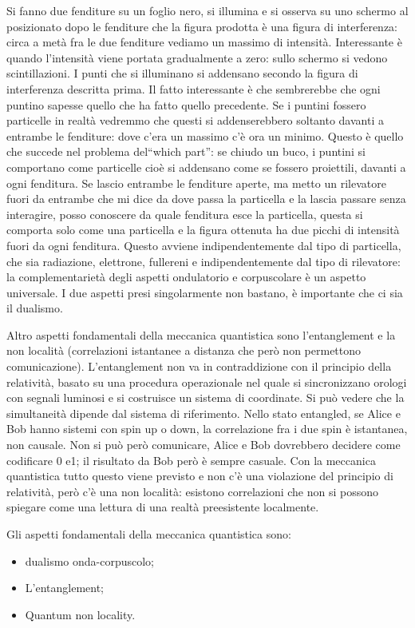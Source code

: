 Si fanno due fenditure su un foglio nero, si illumina e si osserva
su uno schermo al posizionato dopo le fenditure che la figura prodotta
è una figura di interferenza: circa a metà fra le due fenditure vediamo
un massimo di intensità. Interessante è quando l'intensità viene portata
gradualmente a zero: sullo schermo si vedono scintillazioni. I punti
che si illuminano si addensano secondo la figura di interferenza descritta
prima. Il fatto interessante è che sembrerebbe che ogni puntino sapesse
quello che ha fatto quello precedente. Se i puntini fossero particelle
in realtà vedremmo che questi si addenserebbero soltanto davanti a
entrambe le fenditure: dove c'era un massimo c'è ora un minimo. Questo
è quello che succede nel problema del``which part'': se chiudo
un buco, i puntini si comportano come particelle cioè si addensano
come se fossero proiettili, davanti a ogni fenditura. Se lascio entrambe
le fenditure aperte, ma metto un rilevatore fuori da entrambe che
mi dice da dove passa la particella e la lascia passare senza interagire,
posso conoscere da quale fenditura esce la particella, questa si comporta
solo come una particella e la figura ottenuta ha due picchi di intensità
fuori da ogni fenditura. Questo avviene indipendentemente dal tipo
di particella, che sia radiazione, elettrone, fullereni e indipendentemente
dal tipo di rilevatore: la complementarietà degli aspetti ondulatorio
e corpuscolare è un aspetto universale. I due aspetti presi singolarmente
non bastano, è importante che ci sia il dualismo.

Altro aspetti fondamentali della meccanica quantistica sono l'entanglement
e la non località (correlazioni istantanee a distanza che però non
permettono comunicazione). L'entanglement non va in contraddizione
con il principio della relatività, basato su una procedura operazionale
nel quale si sincronizzano orologi con segnali luminosi e si costruisce
un sistema di coordinate. Si può vedere che la simultaneità dipende
dal sistema di riferimento. Nello stato entangled, se Alice e Bob
hanno sistemi con spin up o down, la correlazione fra i due spin è
istantanea, non causale. Non si può però comunicare, Alice e Bob dovrebbero
decidere come codificare 0 e1; il risultato da Bob però è sempre casuale.
Con la meccanica quantistica tutto questo viene previsto e non c'è
una violazione del principio di relatività, però c'è una non località:
esistono correlazioni che non si possono spiegare come una lettura
di una realtà preesistente localmente.

Gli aspetti fondamentali della meccanica quantistica sono:
\begin{itemize}
\item dualismo onda-corpuscolo; 
\item L'entanglement; 
\item Quantum non locality. 
\end{itemize}

